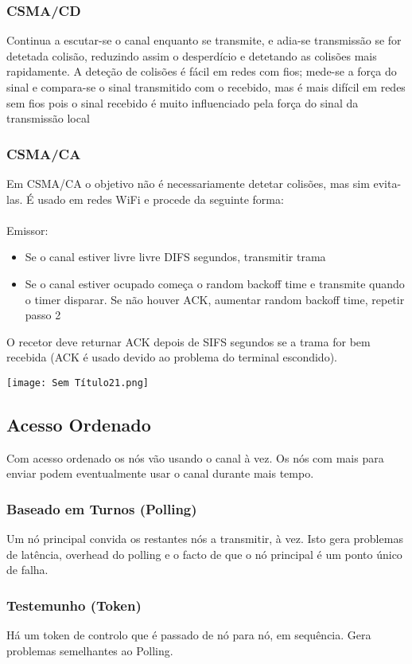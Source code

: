 \documentclass[10pt,a4paper]{report}
\begin{document}
\subsubsection{CSMA/CD}
Continua a escutar-se o canal enquanto se transmite, e adia-se transmissão se for detetada colisão, reduzindo assim o desperdício e detetando as colisões mais rapidamente. A deteção de colisões é fácil em redes com fios; mede-se a força do sinal e compara-se o sinal transmitido com o recebido, mas é mais difícil em redes sem fios pois o sinal recebido é muito influenciado pela força do sinal da transmissão local
\subsubsection{CSMA/CA}
\begin{minipage}[c]{0.7\linewidth}
Em CSMA/CA o objetivo não é necessariamente detetar colisões, mas sim evita-las. É usado em redes WiFi e procede da seguinte forma:\\
\\
Emissor:
\begin{itemize}
\item Se o canal estiver livre livre DIFS segundos, transmitir trama
\item Se o canal estiver ocupado começa o random backoff time e transmite quando o timer disparar. Se não houver ACK, aumentar random backoff time, repetir passo 2
\end{itemize}
O recetor deve returnar ACK depois de SIFS segundos se  a trama for bem recebida (ACK é usado devido ao problema do terminal escondido).
\end{minipage}
\begin{minipage}[c]{0.35\linewidth}
\texttt{[image: Sem Título21.png]}
\end{minipage}
\subsection{Acesso Ordenado}
Com acesso ordenado os nós vão usando o canal à vez. Os nós com mais para enviar podem eventualmente usar o canal durante mais tempo.
\subsubsection{Baseado em Turnos (Polling)}
Um nó principal convida os restantes nós a transmitir, à vez. Isto gera problemas de latência, overhead do polling e o facto de que o nó principal é um ponto único de falha.
\subsubsection{Testemunho (Token)}
Há um token de controlo que é passado de nó para nó, em sequência. Gera problemas semelhantes ao Polling.
\end{document}
